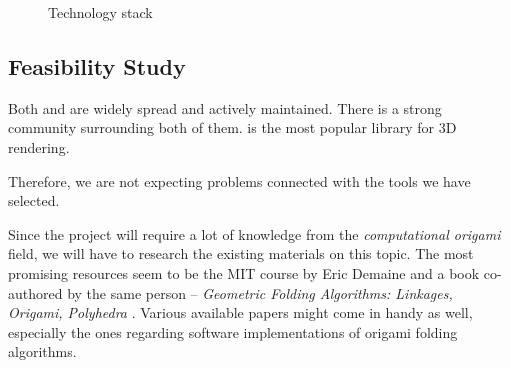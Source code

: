 \begin{figure}[H]
	\caption{Technology stack}
	\centering
\end{figure}


\subsection{Feasibility Study}

Both  and  are widely spread and actively maintained.
There is a strong community surrounding both of them.
 is the most popular library for 3D  rendering.

Therefore, we are not expecting problems connected with the tools we have selected.

Since the project will require a lot of knowledge from the \textit{computational origami}
field, we will have to research the existing materials on this topic.
The most promising resources seem to be the MIT course by
Eric Demaine \cite{mit-course} and a book co-authored by the same person -- \textit{Geometric Folding Algorithms: Linkages, Origami, Polyhedra} \cite{origami-book}.
Various available papers might come in handy as well, especially the ones regarding software implementations of origami folding algorithms.


